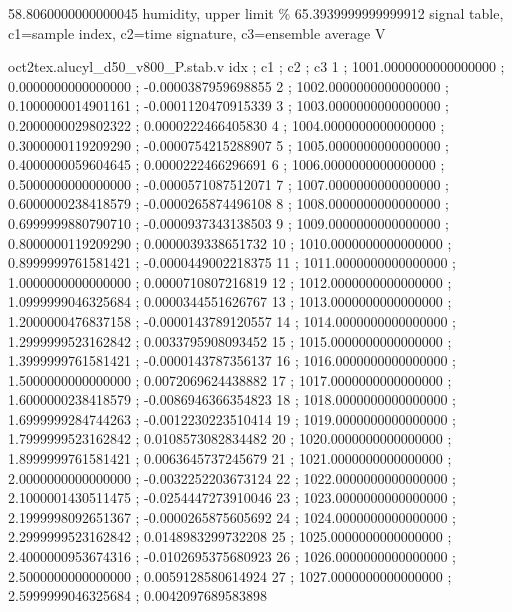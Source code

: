 \expandafter\def\csname oct2tex.alucyl_d50_v800_P.hua.v\endcsname{58.8060000000000045}
\expandafter\def\csname oct2tex.alucyl_d50_v800_P.hub.d\endcsname{humidity, upper limit}
\expandafter\def\csname oct2tex.alucyl_d50_v800_P.hub.u\endcsname{\ensuremath{\%}}
\expandafter\def\csname oct2tex.alucyl_d50_v800_P.hub.v\endcsname{65.3939999999999912}
\expandafter\def\csname oct2tex.alucyl_d50_v800_P.stab.d\endcsname{signal table, c1=sample index, c2=time signature, c3=ensemble average}
\expandafter\def\csname oct2tex.alucyl_d50_v800_P.stab.u\endcsname{\ensuremath{\text{V}}}
\begin{filecontents}[overwrite]{oct2tex.alucyl_d50_v800_P.stab.v}
idx ; c1 ; c2 ; c3
1 ; 1001.0000000000000000 ; 0.0000000000000000 ; -0.0000387959698855
2 ; 1002.0000000000000000 ; 0.1000000014901161 ; -0.0001120470915339
3 ; 1003.0000000000000000 ; 0.2000000029802322 ; 0.0000222466405830
4 ; 1004.0000000000000000 ; 0.3000000119209290 ; -0.0000754215288907
5 ; 1005.0000000000000000 ; 0.4000000059604645 ; 0.0000222466296691
6 ; 1006.0000000000000000 ; 0.5000000000000000 ; -0.0000571087512071
7 ; 1007.0000000000000000 ; 0.6000000238418579 ; -0.0000265874496108
8 ; 1008.0000000000000000 ; 0.6999999880790710 ; -0.0000937343138503
9 ; 1009.0000000000000000 ; 0.8000000119209290 ; 0.0000039338651732
10 ; 1010.0000000000000000 ; 0.8999999761581421 ; -0.0000449002218375
11 ; 1011.0000000000000000 ; 1.0000000000000000 ; 0.0000710807216819
12 ; 1012.0000000000000000 ; 1.0999999046325684 ; 0.0000344551626767
13 ; 1013.0000000000000000 ; 1.2000000476837158 ; -0.0000143789120557
14 ; 1014.0000000000000000 ; 1.2999999523162842 ; 0.0033795908093452
15 ; 1015.0000000000000000 ; 1.3999999761581421 ; -0.0000143787356137
16 ; 1016.0000000000000000 ; 1.5000000000000000 ; 0.0072069624438882
17 ; 1017.0000000000000000 ; 1.6000000238418579 ; -0.0086946366354823
18 ; 1018.0000000000000000 ; 1.6999999284744263 ; -0.0012230223510414
19 ; 1019.0000000000000000 ; 1.7999999523162842 ; 0.0108573082834482
20 ; 1020.0000000000000000 ; 1.8999999761581421 ; 0.0063645737245679
21 ; 1021.0000000000000000 ; 2.0000000000000000 ; -0.0032252203673124
22 ; 1022.0000000000000000 ; 2.1000001430511475 ; -0.0254447273910046
23 ; 1023.0000000000000000 ; 2.1999998092651367 ; -0.0000265875605692
24 ; 1024.0000000000000000 ; 2.2999999523162842 ; 0.0148983299732208
25 ; 1025.0000000000000000 ; 2.4000000953674316 ; -0.0102695375680923
26 ; 1026.0000000000000000 ; 2.5000000000000000 ; 0.0059128580614924
27 ; 1027.0000000000000000 ; 2.5999999046325684 ; 0.0042097689583898

\end{filecontents}
